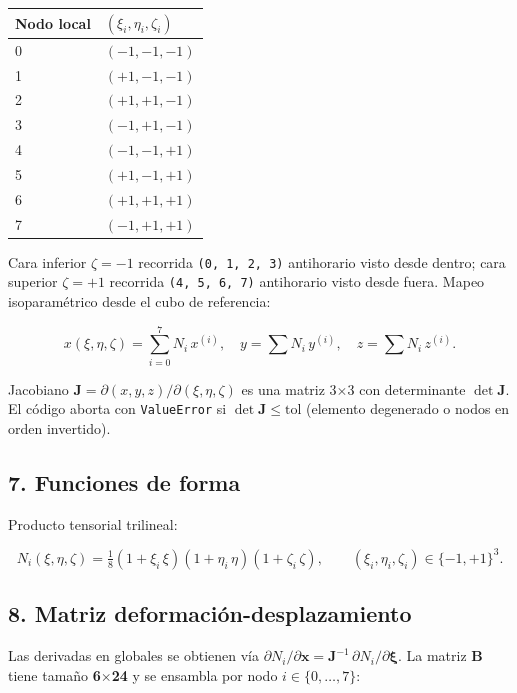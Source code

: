 \documentclass[11pt,letterpaper,oneside]{report}
\begin{document}
\begin{center}
\begin{tabularx}{\textwidth}{YY}
\hline
\textbf{Nodo local} & \textbf{$(\xi_i, \eta_i, \zeta_i)$} \\
 & $(-1, -1, -1)$ \\
1 & $(+1, -1, -1)$ \\
2 & $(+1, +1, -1)$ \\
3 & $(-1, +1, -1)$ \\
4 & $(-1, -1, +1)$ \\
5 & $(+1, -1, +1)$ \\
6 & $(+1, +1, +1)$ \\
7 & $(-1, +1, +1)$ \\
\hline
\end{tabularx}
\end{center}
Cara inferior $\zeta = -1$ recorrida \texttt{(0, 1, 2, 3)} antihorario visto desde dentro; cara superior $\zeta = +1$ recorrida \texttt{(4, 5, 6, 7)} antihorario visto desde fuera. Mapeo isoparamétrico desde el cubo de referencia:

\[
x(\xi, \eta, \zeta) = \sum_{i=0}^{7} N_i\, x^{(i)}, \quad y = \sum N_i\, y^{(i)}, \quad z = \sum N_i\, z^{(i)}.
\]

Jacobiano $\mathbf J = \partial(x, y, z) / \partial(\xi, \eta, \zeta)$ es una matriz 3\ensuremath{\times}3 con determinante $\det\mathbf J$. El código aborta con \texttt{ValueError} si $\det\mathbf J \le \text{tol}$ (elemento degenerado o nodos en orden invertido).

\subsection{7. Funciones de forma}

Producto tensorial trilineal:

\[
N_i(\xi, \eta, \zeta) = \tfrac{1}{8}(1 + \xi_i\,\xi)(1 + \eta_i\,\eta)(1 + \zeta_i\,\zeta), \qquad (\xi_i, \eta_i, \zeta_i) \in \{-1, +1\}^3.
\]

\subsection{8. Matriz deformación-desplazamiento}

Las derivadas en globales se obtienen vía $\partial N_i / \partial \mathbf x = \mathbf J^{-1}\,\partial N_i / \partial \boldsymbol\xi$. La matriz $\mathbf B$ tiene tamaño \textbf{6\ensuremath{\times}24} y se ensambla por nodo $i \in \{0,\dots,7\}$:
\end{document}
